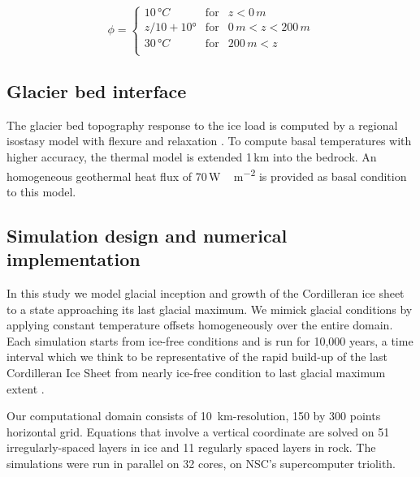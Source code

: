 \begin{equation}
	\phi = \left\{\begin{array}{llc}
		10\,\unit{\degree C} & \mathrm{for} &               z<  0\,\unit{m} \\
		z/10 + 10°           & \mathrm{for} &   0\,\unit{m}<z<200\,\unit{m} \\
		30\,\unit{\degree C} & \mathrm{for} & 200\,\unit{m}<z               \\
	\end{array}\right.
\end{equation}

\subsection{Glacier bed interface}

The glacier bed topography response to the ice load is computed by a regional isostasy model with flexure and relaxation \citep{lingle-clark-1985}. To compute basal temperatures with higher accuracy, the thermal model is extended 1\,km into the bedrock. An homogeneous geothermal heat flux of 70\,\unit{W\,m^{-2}} is provided as basal condition to this model.

\subsection{Simulation design and numerical implementation}

In this study we model glacial inception and growth of the Cordilleran ice sheet to a state approaching its last glacial maximum. We mimick glacial conditions by applying constant temperature offsets homogeneously over the entire domain. Each simulation starts from ice-free conditions and is run for 10,000 years, a time interval which we think to be representative of the rapid build-up of the last Cordilleran Ice Sheet from nearly ice-free condition to last glacial maximum extent \needref.

Our computational domain consists of 10~km-resolution, 150 by 300 points horizontal grid. Equations that involve a vertical coordinate are solved on 51 irregularly-spaced layers in ice and 11 regularly spaced layers in rock. The simulations were run in parallel on 32 cores, on NSC's supercomputer triolith\needref.

